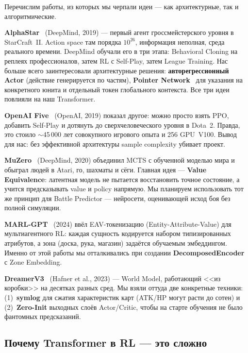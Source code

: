 \documentclass[a4paper,12pt]{extarticle}
\begin{document}
Перечислим работы, из которых мы черпали идеи --- как архитектурные, так и алгоритмические.

\textbf{AlphaStar}~\cite{alphastar} (DeepMind, 2019) --- первый агент гроссмейстерского уровня в StarCraft~II. Action space там порядка $10^{26}$, информация неполная, среда реального времени. DeepMind обучали его в три этапа: Behavioral Cloning на реплеях профессионалов, затем RL с Self-Play, затем League Training. Нас больше всего заинтересовали архитектурные решения: \textbf{авторегрессионный Actor} (действие генерируется по частям), \textbf{Pointer Network}~\cite{pointer} для указания на конкретного юнита и отдельный токен глобального контекста. Все три идеи повлияли на наш Transformer.

\textbf{OpenAI Five}~\cite{openai_five} (OpenAI, 2019) показал другое: можно просто взять PPO, добавить Self-Play и дотянуть до сверхчеловеческого уровня в Dota~2. Правда, это стоило $\sim$45\,000 лет совокупного игрового опыта и 256 GPU~V100. Вывод для нас: без эффективной архитектуры sample complexity убивает проект.

\textbf{MuZero}~\cite{muzero} (DeepMind, 2020) объединил MCTS с обученной моделью мира и обыграл людей в Atari, го, шахматы и сёги. Главная идея --- \textbf{Value Equivalence}: латентная модель не пытается восстановить точное состояние, а учится предсказывать value и policy напрямую. Мы планируем использовать тот же принцип для Battle Predictor --- нейросети, оценивающей исход боя без полной симуляции.

\textbf{MARL-GPT}~\cite{marl_gpt} (2024) ввёл EAV-токенизацию (Entity-Attribute-Value) для мультиагентного RL: каждая сущность кодируется набором типизированных атрибутов, а зона (доска, рука, магазин) задаётся обучаемым эмбеддингом. Именно от этой работы мы отталкивались при создании \textbf{DecomposedEncoder} с Zone Embedding.

\textbf{DreamerV3}~\cite{dreamerv3} (Hafner et al., 2023) --- World Model, работающий <<из коробки>> на десятках разных сред. Мы взяли оттуда две конкретные техники: (1)~\textbf{symlog} для сжатия характеристик карт (ATK/HP могут расти до сотен) и (2)~\textbf{Zero-Init} выходных слоёв Actor/Critic, чтобы на старте обучения не было фантомных предсказаний.

\subsection{Почему Transformer в RL --- это сложно}
\end{document}
